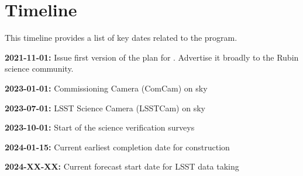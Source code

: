 \section{Timeline} \label{sec:timeline}

This timeline provides a list of key dates  related to the \es program. 

{\bf 2021-11-01:} Issue first version of the \ro plan for \es. Advertise it broadly to the Rubin science community. 

{\bf 2023-01-01:} Commissioning Camera (ComCam) on sky

{\bf 2023-07-01:} LSST Science Camera (LSSTCam) on sky

{\bf 2023-10-01:} Start of the science verification surveys

{\bf 2024-01-15:} Current earliest completion date for construction

{\bf 2024-XX-XX:} Current forecast start date for LSST data taking

